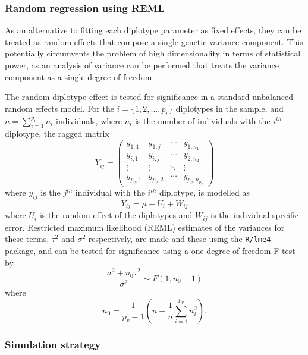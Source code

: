 \subsubsection{Random regression using REML}
\label{sec:dip_reml}

As an alternative to fitting each diplotype parameter as fixed effects, they can be treated as random effects that compose a single genetic variance component. This potentially circumvents the problem of high dimensionality in terms of statistical power, as an analysis of variance can be performed that treats the variance component as a single degree of freedom.

The random diplotype effect is tested for significance in a standard unbalanced random effects model. For the $i = \{1, 2, ..., p_{v} \}$ diplotypes in the sample, and $n = \sum^{p_{v}}_{i=1} n_{i}$ individuals, where $n_{i}$ is the number of individuals with the $i^{th}$ diplotype, the ragged matrix 
\begin{equation}
Y_{ij} = \begin{pmatrix}
y_{1,1}	& 	y_{1,j}	&	\cdots	&	y_{1,n_{1}} \\
y_{i,1}	&	y_{i,j}	&	\cdots	&	y_{2,n_{2}} \\
\vdots	&	\vdots	&	\ddots	&	\vdots \\
y_{p_{v},1} &	y_{p_{v},2} &	\cdots	&	y_{p_{v}, n_{p_{v}}}
\end{pmatrix}
\end{equation}
where $y_{ij}$ is the $j^{th}$ individual with the $i^{th}$ diplotype, is modelled as
\begin{equation}
Y_{ij} = \mu + U_{i} + W_{ij}
\end{equation}
where $U_{i}$ is the random effect of the diplotypes and $W_{ij}$ is the individual-specific error. Restricted maximum likelihood (REML) estimates of the variances for these terms, $\tau^{2}$ and $\sigma^{2}$ respectively, are made and these using the {\tt R/lme4} package, and can be tested for significance using a one degree of freedom F-test by
\begin{equation}
\frac{\sigma^{2} + n_{0} \tau^{2}}{\sigma^{2}} \sim F(1, n_{0}-1)
\end{equation}
where
\begin{equation}
n_{0} = \frac{1}{p_{v} - 1} \left (n - \frac{1}{n}\sum^{p_{v}}_{i = 1} n_{i}^{2} \right ).
\end{equation}

\subsubsection{Simulation strategy}

